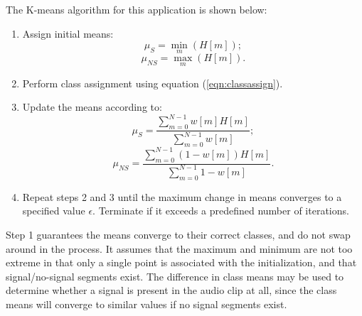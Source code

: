 \begin{subappendices}
	The K-means algorithm for this application is shown below:
	\begin{enumerate}
		\item Assign initial means:
		\begin{equation*}
			\mu_S = \min\limits_{m}\left(H[m]\right);
		\end{equation*}
		\begin{equation*}
			\mu_{NS} = \max\limits_{m}\left(H[m]\right).
		\end{equation*}
		\item Perform class assignment using equation (\ref{eqn:classassign}).
		\item Update the means according to:
			\begin{equation*}
				\mu_S = \frac{\sum_{m=0}^{N-1} w[m] H[m]}{\sum_{m=0}^{N-1} w[m] };
			\end{equation*}
			\begin{equation*}
				\mu_{NS} = \frac{\sum_{m=0}^{N-1} (1-w[m]) H[m]}{\sum_{m=0}^{N-1} 1 - w[m] }.
			\end{equation*}
		\item Repeat steps 2 and 3 until the maximum change in means converges to a specified value $\epsilon$. Terminate if it exceeds a predefined number of iterations.
	\end{enumerate}
	
	Step 1 guarantees the means converge to their correct classes, and do not swap around in the process. It assumes that the maximum and minimum are not too extreme in that only a single point is associated with the initialization, and that signal/no-signal segments exist. The difference in class means may be used to determine whether a signal is present in the audio clip at all, since the class means will converge to similar values if no signal segments exist.
\end{subappendices}


